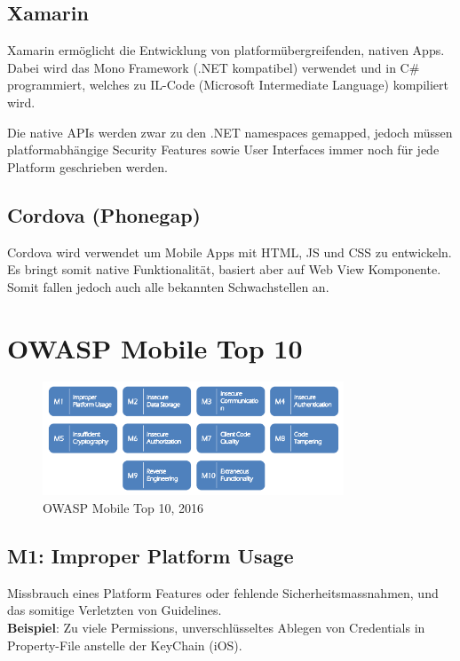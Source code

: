 \subsection{Xamarin}
Xamarin ermöglicht die Entwicklung von platformübergreifenden, nativen Apps. Dabei wird das Mono Framework (.NET kompatibel) verwendet und in C\# programmiert, welches zu IL-Code (Microsoft Intermediate Language) kompiliert wird.

Die native APIs werden zwar zu den .NET namespaces gemapped, jedoch müssen platformabhängige Security Features sowie User Interfaces immer noch für jede Platform geschrieben werden.

\subsection{Cordova (Phonegap)}
Cordova wird verwendet um Mobile Apps mit HTML, JS und CSS zu entwickeln. Es bringt somit native Funktionalität, basiert aber auf Web View Komponente. Somit fallen jedoch auch alle bekannten Schwachstellen an.

\section{OWASP Mobile Top 10}
\begin{figure}[H]
	\centering
	\includegraphics[width=0.8\textwidth]{./img/OWASP_MobileTop10}
	\caption{OWASP Mobile Top 10, 2016}
\end{figure}

\subsection{M1: Improper Platform Usage}
Missbrauch eines Platform Features oder fehlende Sicherheitsmassnahmen, und das somitige Verletzten von Guidelines. \\

\textbf{Beispiel}: Zu viele Permissions, unverschlüsseltes Ablegen von Credentials in Property-File anstelle der KeyChain (iOS). \\

